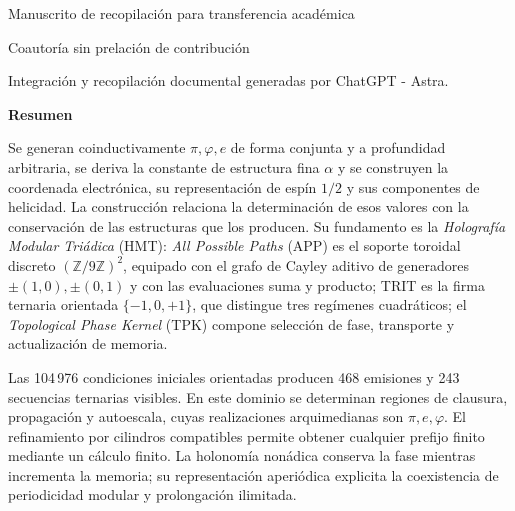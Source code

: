 \thispagestyle{plain}
\begingroup\centering
{\fontsize{9.5}{10.7}\selectfont Manuscrito de recopilación para transferencia académica\par}
\vspace{3mm}
{\fontsize{17}{20.5}\selectfont\bfseries\Titulo\par}
\vspace{6pt}
{\fontsize{11.5}{14}\selectfont\Autores\par}
\vspace{3pt}
{\fontsize{8}{10}\selectfont Coautoría sin prelación de contribución\par}
\vspace{3pt}
{\fontsize{8}{10}\selectfont Integración y recopilación documental generadas por ChatGPT - Astra.\par}
\par\endgroup
\vspace{5pt}
{\centering\bfseries Resumen\par}
\vspace{2pt}
\begingroup
\fontsize{9.5}{10.7}\selectfont
\setlength{\parskip}{1.5pt plus .5pt minus .5pt}
\noindent
Se generan coinductivamente \(\pi,\varphi,e\) de forma conjunta y a profundidad arbitraria, se
deriva la constante de estructura fina \(\alpha\) y se construyen la
coordenada electrónica, su representación de espín \(1/2\) y sus
componentes de helicidad. La construcción relaciona la determinación de
esos valores con la conservación de las estructuras que los producen.
Su fundamento es la \emph{Holografía Modular Triádica} (HMT):
\emph{All Possible Paths} (APP) es el soporte toroidal discreto
\((\mathbb Z/9\mathbb Z)^2\), equipado con el grafo de Cayley aditivo
de generadores \(\pm(1,0),\pm(0,1)\) y con las evaluaciones suma y
producto; TRIT es la firma ternaria orientada \(\{-1,0,+1\}\), que
distingue tres regímenes cuadráticos; el \emph{Topological Phase Kernel}
(TPK) compone selección de fase, transporte y actualización de memoria.

Las 104\,976 condiciones iniciales orientadas producen 468 emisiones y 243
secuencias ternarias visibles. En este dominio se determinan regiones de
clausura, propagación y autoescala, cuyas realizaciones arquimedianas son
\(\pi,e,\varphi\). El refinamiento por cilindros compatibles permite obtener
cualquier prefijo finito mediante un cálculo finito. La holonomía nonádica
conserva la fase mientras incrementa la memoria; su representación aperiódica
explicita la coexistencia de periodicidad modular y prolongación ilimitada.

